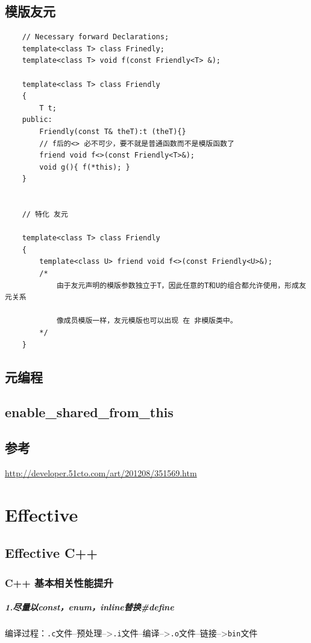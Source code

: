 \documentclass[UTF8,a4paper,12pt]{ctexbook}
\begin{document}
\section{模版友元}
	\begin{lstlisting}
	// Necessary forward Declarations;
	template<class T> class Frinedly;
	template<class T> void f(const Friendly<T> &);
	
	template<class T> class Friendly
	{
		T t;
	public:
		Friendly(const T& theT):t (theT){}
		// f后的<> 必不可少，要不就是普通函数而不是模版函数了
		friend void f<>(const Friendly<T>&);
		void g(){ f(*this); }
	}
	
	
	// 特化 友元
	
	template<class T> class Friendly
	{
		template<class U> friend void f<>(const Friendly<U>&);
		/*
			由于友元声明的模版参数独立于T，因此任意的T和U的组合都允许使用，形成友元关系
			
			像成员模版一样，友元模版也可以出现 在 非模版类中。
		*/
	}
	\end{lstlisting}	
	
\section{元编程}
	

\section{enable\_shared\_from\_this}
	
	
\section{参考}\url{http://developer.51cto.com/art/201208/351569.htm}    

\chapter{Effective}
	\section{Effective C++}
		\subsection{C++ 基本相关性能提升}
		\paragraph{1.尽量以const，enum，inline替换\#define} 编译过程：\verb|.c|文件--预处理-->\verb|.i|文件--编译-->\verb|.o|文件--链接-->\verb|bin|文件
		
\end{document}
